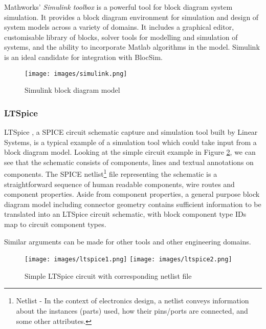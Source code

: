 Mathworks' \textit{Simulink toolbox} \cite{simulink} is a powerful tool for block diagram system simulation. It provides a block diagram environment for simulation and design of system models across a variety of domains. It includes a graphical editor, customisable library of blocks, solver tools for modelling and simulation of systems, and the ability to incorporate Matlab algorithms in the model. Simulink is an ideal candidate for integration with BlocSim.

\begin{figure}[ht!]
\texttt{[image: images/simulink.png]} 
\centering
\caption{Simulink block diagram model}
\label{im:simulink}
\end{figure}

\subsubsection{LTSpice}

LTSpice \cite{ltspice}, a SPICE circuit schematic capture and simulation tool built by Linear Systems, is a typical example of a simulation tool which could take input from a block diagram model. Looking at the simple circuit example in Figure \ref{im:ltspice}, we can see that the schematic consists of components, lines and textual annotations on components. The SPICE netlist\footnote{Netlist - In the context of electronics design, a netlist conveys information about the instances (parts) used, how their pins/ports are connected, and some other attributes.} file representing the schematic is a straightforward sequence of human readable components, wire routes and component properties. Aside from component properties, a general purpose block diagram model including connector geometry contains sufficient information to be translated into an LTSpice circuit schematic, with block component type IDs map to circuit component types.

Similar arguments can be made for other tools and other engineering domains.



\begin{figure}[ht!]
\centering
\texttt{[image: images/ltspice1.png]}
\texttt{[image: images/ltspice2.png]}
\caption{Simple LTSpice circuit with corresponding netlist file \cite{ltspice}}
\label{im:ltspice}
\end{figure}

